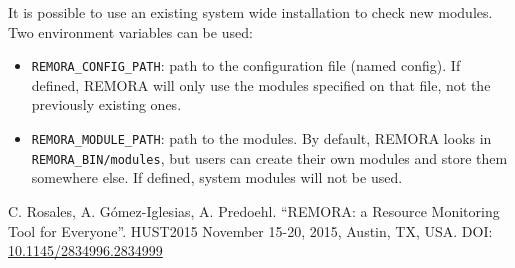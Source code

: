 \documentclass[10pt,a4paper]{report}
\begin{document}
It is possible to use an existing system wide installation to check new modules. Two environment variables can be used:
\begin{itemize}
        \item \texttt{REMORA\_CONFIG\_PATH}: path to the configuration file (named config). If defined, REMORA will only use the modules specified on that file, not the previously existing ones.
        \item \texttt{REMORA\_MODULE\_PATH}: path to the modules. By default, REMORA looks in \texttt{REMORA\_BIN/modules}, but users can create their own modules and store them somewhere else. If defined, system modules will not be used.
\end{itemize}

\FloatBarrier
{}
\begin{thebibliography}{00}

 C. Rosales, A. G\'{o}mez-Iglesias, A. Predoehl. ``REMORA: a Resource Monitoring Tool for Everyone''. HUST2015 November 15-20, 2015, Austin, TX, USA. DOI: \href{http://dx.doi.org/10.1145/2834996.2834999}{10.1145/2834996.2834999}


\end{thebibliography}
\end{document}
